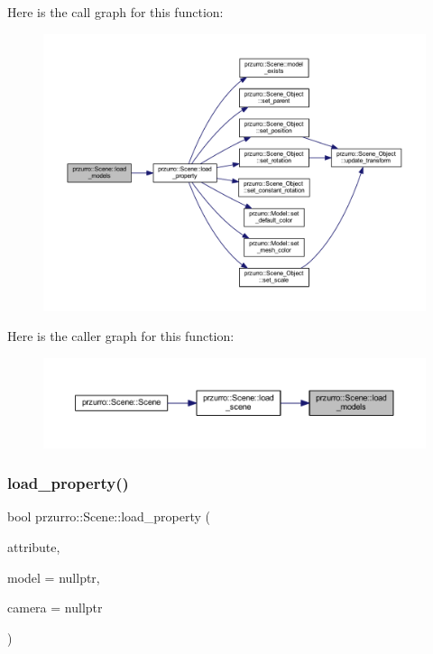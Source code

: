 Here is the call graph for this function\+:
\nopagebreak
\begin{figure}[H]
\begin{center}
\leavevmode
\includegraphics[width=350pt]{d8/d56/classprzurro_1_1_scene_a50cf7c0482f02880a64bfa7c270f61ca_cgraph}
\end{center}
\end{figure}
Here is the caller graph for this function\+:
\nopagebreak
\begin{figure}[H]
\begin{center}
\leavevmode
\includegraphics[width=350pt]{d8/d56/classprzurro_1_1_scene_a50cf7c0482f02880a64bfa7c270f61ca_icgraph}
\end{center}
\end{figure}
\mbox{\label{classprzurro_1_1_scene_a62b094d029473e81e2bcc43d7bc01777}} 
\subsubsection{\texorpdfstring{load\_property()}{load\_property()}}
{\footnotesize\ttfamily bool przurro\+::\+Scene\+::load\+\_\+property (\begin{DoxyParamCaption}\item[{X\+M\+L\+\_\+\+Node $\ast$}]{attribute,  }\item[{\mbox{\hyperlink{classprzurro_1_1_model}{Model}} $\ast$}]{model = {\ttfamily nullptr},  }\item[{\mbox{\hyperlink{classprzurro_1_1_camera}{Camera}} $\ast$}]{camera = {\ttfamily nullptr} }\end{DoxyParamCaption})}



